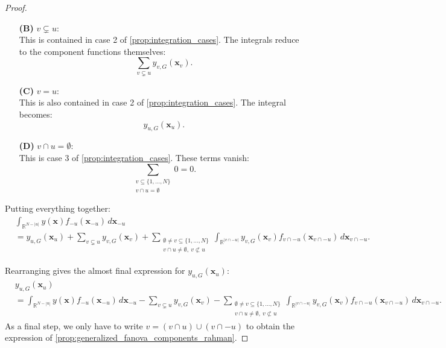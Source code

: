 \begin{proof}
\begin{itemize}
  \item[\textbf{(B)}] \( v \subsetneq u \): \\
  This is contained in case 2 of \autoref{prop:integration_cases}. The integrals reduce to the component functions themselves:
  \[
  \sum_{v \subsetneq u} y_{v,G}(\boldsymbol{x}_v).
  \]

  \item[\textbf{(C)}] \( v = u \): \\
  This is also contained in case 2 of \autoref{prop:integration_cases}. The integral becomes:
  \[
  y_{u,G}(\boldsymbol{x}_u).
  \]

  \item[\textbf{(D)}] \( v \cap u = \emptyset \): \\
  This is case 3 of \autoref{prop:integration_cases}. These terms vanish:
  \[
  \sum_{\substack{v \subseteq \{1,\dots,N\} \\ v \cap u = \emptyset}} 0 = 0.
  \]
\end{itemize}

Putting everything together:
\[
\begin{aligned}
&\int_{\mathbb{R}^{N - |u|}} y(\boldsymbol{x}) f_{-u}(\boldsymbol{x}_{-u}) 
    \, d\boldsymbol{x}_{-u} \\
&= y_{u,G}(\boldsymbol{x}_u)
   + \sum_{v \subsetneq u} y_{v,G}(\boldsymbol{x}_v) + 
   \sum_{\substack{\emptyset \ne v \subseteq \{1,\dots,N\} \\
                   v \cap u \ne \emptyset,\ v \not\subset u}} 
   \int_{\mathbb{R}^{|v \cap -u|}} 
        y_{v,G}(\boldsymbol{x}_v) 
        f_{v \cap -u}(\boldsymbol{x}_{v \cap -u}) 
        \, d\boldsymbol{x}_{v \cap -u}.
\end{aligned}
\]


Rearranging gives the almost final expression for \( y_{u,G}(\boldsymbol{x}_u) \):
\[
\begin{aligned}
&y_{u,G}(\boldsymbol{x}_u) \\
&= \int_{\mathbb{R}^{N - |u|}} y(\boldsymbol{x}) f_{-u}(\boldsymbol{x}_{-u}) \, d\boldsymbol{x}_{-u}
- \sum_{v \subsetneq u} y_{v,G}(\boldsymbol{x}_v)
- \sum_{\substack{\emptyset \ne v \subseteq \{1,\dots,N\} \\ v \cap u \ne \emptyset,\ v \not\subset u}} 
\int_{\mathbb{R}^{|v \cap -u|}} y_{v,G}(\boldsymbol{x}_v) f_{v \cap -u}(\boldsymbol{x}_{v \cap -u}) \, d\boldsymbol{x}_{v \cap -u}.
\end{aligned}
\]
As a final step, we only have to write \( v = (v \cap u) \cup (v \cap -u) \) to obtain the expression of \autoref{prop:generalized_fanova_components_rahman}.

\end{proof}

